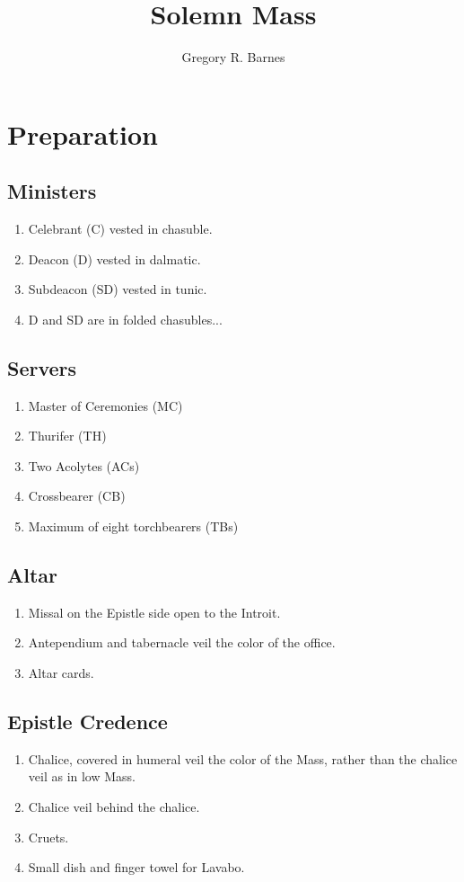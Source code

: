 \documentclass[letterpaper, twocolumn]{article}
\title{Solemn Mass}
\author{Gregory R. Barnes}
\begin{document}
	\maketitle
	\section*{Preparation}
	\subsection*{Ministers}
	\begin{enumerate}
		\item Celebrant (C) vested in chasuble.
		\item Deacon (D) vested in dalmatic.
		\item Subdeacon (SD) vested in tunic.
		\item D and SD are in folded chasubles...
	\end{enumerate}
	\subsection*{Servers}
	\begin{enumerate}
		\item Master of Ceremonies (MC)
		\item Thurifer (TH)
		\item Two Acolytes (ACs)
		\item Crossbearer (CB)
		\item Maximum of eight torchbearers (TBs)
	\end{enumerate}
	\subsection*{Altar}
	\begin{enumerate}
		\item Missal on the Epistle side open to the Introit.
		\item Antependium and tabernacle veil the color of the office.
		\item Altar cards.
	\end{enumerate}
	\subsection*{Epistle Credence}
	\begin{enumerate}
		\item Chalice, covered in humeral veil the color of the Mass, rather than the chalice veil as in low Mass.
		\item Chalice veil behind the chalice.
		\item Cruets.
		\item Small dish and finger towel for Lavabo.
	\end{enumerate}
\end{document}
